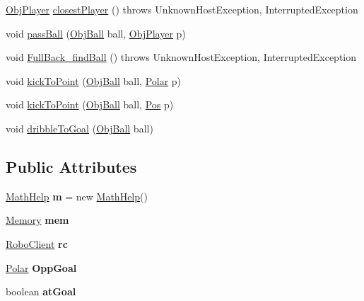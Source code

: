 \begin{DoxyCompactItemize}
\item 
\hyperlink{classObjPlayer}{ObjPlayer} \hyperlink{classAction_a63d035f7132842d9720b88247d525112}{closestPlayer} ()  throws UnknownHostException, InterruptedException 
\item 
void \hyperlink{classAction_a55e146013466e96013a196d9bd787410}{passBall} (\hyperlink{classObjBall}{ObjBall} ball, \hyperlink{classObjPlayer}{ObjPlayer} p)
\item 
void \hyperlink{classAction_a9e883bc90ec59c4eeb5b0b3dd022b33a}{FullBack\_\-findBall} ()  throws UnknownHostException, InterruptedException 
\item 
void \hyperlink{classAction_ad7308d47f6303c20834dda533d4fe793}{kickToPoint} (\hyperlink{classObjBall}{ObjBall} ball, \hyperlink{classPolar}{Polar} p)
\item 
void \hyperlink{classAction_a639b23a22badac8eb8603bc153daba99}{kickToPoint} (\hyperlink{classObjBall}{ObjBall} ball, \hyperlink{classPos}{Pos} p)
\item 
void \hyperlink{classAction_a87bb8972c15138562c9d05f2a475dda9}{dribbleToGoal} (\hyperlink{classObjBall}{ObjBall} ball)
\end{DoxyCompactItemize}
\subsection*{Public Attributes}
\begin{DoxyCompactItemize}
\item 
\hypertarget{classAction_a7a8b88c7cb187a0d532b9f9bd7507e7b}{
\hyperlink{classMathHelp}{MathHelp} {\bfseries m} = new \hyperlink{classMathHelp}{MathHelp}()}
\label{classAction_a7a8b88c7cb187a0d532b9f9bd7507e7b}

\item 
\hypertarget{classAction_a660d99e264008b78e61f230243c5edde}{
\hyperlink{classMemory}{Memory} {\bfseries mem}}
\label{classAction_a660d99e264008b78e61f230243c5edde}

\item 
\hypertarget{classAction_ad62f59e63c17a404d96ead732c8dca9d}{
\hyperlink{classRoboClient}{RoboClient} {\bfseries rc}}
\label{classAction_ad62f59e63c17a404d96ead732c8dca9d}

\item 
\hypertarget{classAction_a46082e1ed9885927142dc31320c8f2f1}{
\hyperlink{classPolar}{Polar} {\bfseries OppGoal}}
\label{classAction_a46082e1ed9885927142dc31320c8f2f1}

\item 
\hypertarget{classAction_ab9062c12826530e380a93d7bbc8829a5}{
boolean {\bfseries atGoal}}
\label{classAction_ab9062c12826530e380a93d7bbc8829a5}

\end{DoxyCompactItemize}


